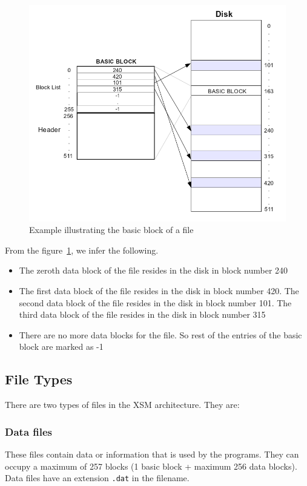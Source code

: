 \documentclass[11pt]{article}
\begin{document}
	\begin{figure}[h!]
	\centering
	\includegraphics[scale=0.50]{basic_block_example.png}
	\caption{Example illustrating the basic block of a file}
	\label{basic block example}
	\end{figure}
	

	From the figure~\ref{basic block example}, we infer the following. 
	\begin{itemize}
		\item  The zeroth data block of the file resides in the disk in block number 240
		\item  The first data block of the file resides in the disk in block number 420. The second data block of the file resides in the disk in block number 101. The third data block of the file resides in the disk in block number 315
		\item  There are no more data blocks for the file. So rest of the entries of the basic block are marked as -1
	\end{itemize}


\subsection{File Types} 
There are two types of files in the XSM architecture. They are:
\subsubsection{Data files} These files contain data or information that is used by the programs. They can occupy a maximum of 257 blocks (1 basic block + maximum 256 data blocks). Data files have an extension \texttt{.dat} in the filename.
	
\end{document}
